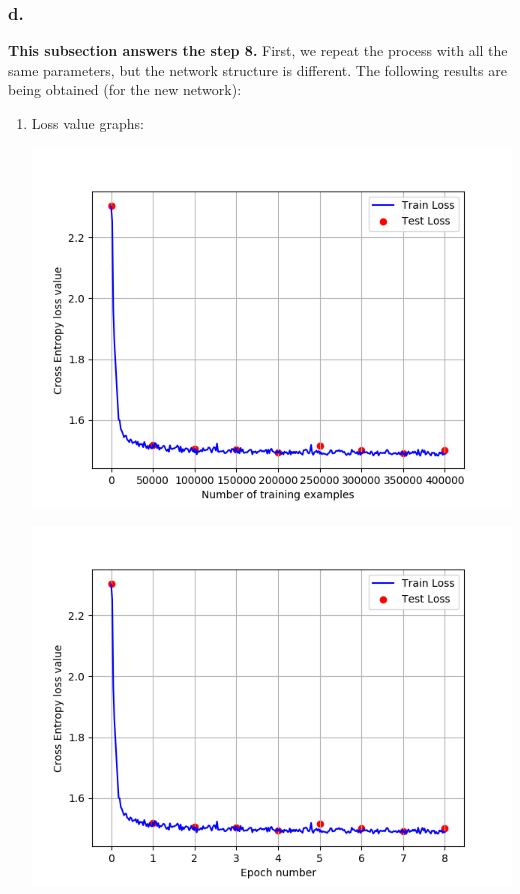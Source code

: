\documentclass[a4paper]{iacas}
\begin{document}
\newpage
\subsubsection{\textbf{d.}}
\textbf{This subsection answers the step 8. }
\newline
First, we repeat the process with all the same parameters, but the network structure is different. The following results are being obtained (for the new network):

\begin{enumerate}
\item Loss value graphs:

\vskip 0.1in
\begin{minipage}{\linewidth}
	\includegraphics[scale=0.8]{hw2_py/results/_14_11_31/lr_0_01_net_2_CE_/loss_value.png}
	\label{fig_19}
\end{minipage}
\vskip 0.1in
\begin{minipage}{\linewidth}
	\includegraphics[scale=0.8]{hw2_py/results/_14_11_31/lr_0_01_net_2_CE_/loss_value_epoch.png}
	\label{fig_20}
\end{minipage}
\vskip 0.1in


\end{enumerate}
\end{document}
